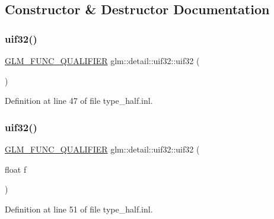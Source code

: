 \subsection{Constructor \& Destructor Documentation}
\mbox{\label{unionglm_1_1detail_1_1uif32_a185c257ac32e21727191ba7e52d97e3e}} 
\subsubsection{\texorpdfstring{uif32()}{uif32()}\hspace{0.1cm}{\footnotesize\ttfamily [1/3]}}
{\footnotesize\ttfamily \hyperlink{setup_8hpp_a33fdea6f91c5f834105f7415e2a64407}{G\+L\+M\+\_\+\+F\+U\+N\+C\+\_\+\+Q\+U\+A\+L\+I\+F\+I\+ER} glm\+::detail\+::uif32\+::uif32 (\begin{DoxyParamCaption}{ }\end{DoxyParamCaption})\hspace{0.3cm}{\ttfamily [inline]}}



Definition at line 47 of file type\+\_\+half.\+inl.

\mbox{\label{unionglm_1_1detail_1_1uif32_ae86c2bd42a88f11e3217d14e46606971}} 
\subsubsection{\texorpdfstring{uif32()}{uif32()}\hspace{0.1cm}{\footnotesize\ttfamily [2/3]}}
{\footnotesize\ttfamily \hyperlink{setup_8hpp_a33fdea6f91c5f834105f7415e2a64407}{G\+L\+M\+\_\+\+F\+U\+N\+C\+\_\+\+Q\+U\+A\+L\+I\+F\+I\+ER} glm\+::detail\+::uif32\+::uif32 (\begin{DoxyParamCaption}\item[{float}]{f }\end{DoxyParamCaption})\hspace{0.3cm}{\ttfamily [inline]}}



Definition at line 51 of file type\+\_\+half.\+inl.

\mbox{\label{unionglm_1_1detail_1_1uif32_a3d5981678c930776894daf8e94295fe2}} 
